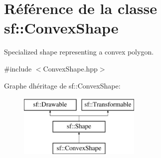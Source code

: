 \hypertarget{classsf_1_1ConvexShape}{}\section{Référence de la classe sf\+:\+:Convex\+Shape}
\label{classsf_1_1ConvexShape}


Specialized shape representing a convex polygon.  




{\ttfamily \#include $<$Convex\+Shape.\+hpp$>$}

Graphe d\textquotesingle{}héritage de sf\+:\+:Convex\+Shape\+:\begin{figure}[H]
\begin{center}
\leavevmode
\includegraphics[height=3.000000cm]{classsf_1_1ConvexShape}
\end{center}
\end{figure}
